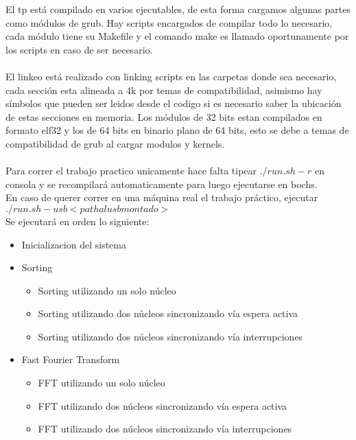     El tp está compilado en varios ejecutables, de esta forma cargamos algunas partes como módulos de grub.
    Hay scripts encargados de compilar todo lo necesario, cada módulo tiene su Makefile y el comando make es llamado
    oportunamente por los scripts en caso de ser necesario.
    \\
    \\
    El linkeo está realizado con linking scripts en las carpetas donde sea necesario,
    cada sección esta alineada a 4k por temas de compatibilidad, asimismo hay símbolos que pueden ser leidos desde el codigo si es necesario saber la ubicación de estas secciones en memoria.
    Los módulos de 32 bits estan compilados en formato elf32 y los de 64 bits en binario plano de 64 bits, esto se debe a temas de compatibilidad de grub al cargar modulos y kernels.
    \\
    \\
    Para correr el trabajo practico unicamente hace falta tipear $./run.sh -r$ en consola y se recompilará automaticamente para luego ejecutarse en bochs.\\
    En caso de querer correr en una máquina real el trabajo práctico, ejecutar $./run.sh -usb <path al usb montado>$\\
    Se ejecutará en orden lo siguiente:
    \begin{itemize}
        \item Inicializacion del sistema
        \item Sorting \begin{itemize}
                    \item Sorting utilizando un solo núcleo
                    \item Sorting utilizando dos núcleos sincronizando vía espera activa
                    \item Sorting utilizando dos núcleos sincronizando vía interrupciones
              \end{itemize}
        \item Fast Fourier Transform \begin{itemize}
                    \item FFT utilizando un solo núcleo
                    \item FFT utilizando dos núcleos sincronizando vía espera activa
                    \item FFT utilizando dos núcleos sincronizando vía interrupciones
              \end{itemize}
    \end{itemize}
